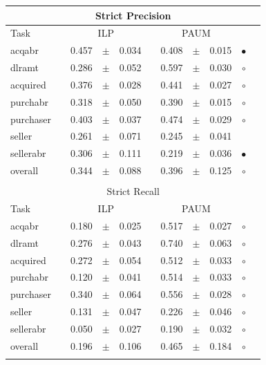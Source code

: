 \begin{table}[h!]
\centering 
\begin{tabular}
{lcrclcrcl@{\hspace{0.1cm}}cc}

\multicolumn{11}{c}{Strict Precision}\\
\hline
Task && \multicolumn{3}{c}{ILP}  && \multicolumn{3}{c}{PAUM} && \\
\hline
            acqabr &&      0.457 &  $\pm$  &       0.034 & &      0.408 &  $\pm$  &       0.015 & $\bullet$ \\
            dlramt &&      0.286 &  $\pm$  &       0.052 & &      0.597 &  $\pm$  &       0.030 & $\circ$ \\
          acquired &&      0.376 &  $\pm$  &       0.028 & &      0.441 &  $\pm$  &       0.027 & $\circ$ \\
          purchabr &&      0.318 &  $\pm$  &       0.050 & &      0.390 &  $\pm$  &       0.015 & $\circ$ \\
         purchaser &&      0.403 &  $\pm$  &       0.037 & &      0.474 &  $\pm$  &       0.029 & $\circ$ \\
            seller &&      0.261 &  $\pm$  &       0.071 & &      0.245 &  $\pm$  &       0.041 &  \\
         sellerabr &&      0.306 &  $\pm$  &       0.111 & &      0.219 &  $\pm$  &       0.036 & $\bullet$ \\
\hline
           overall &&      0.344 &  $\pm$  &       0.088 & &      0.396 &  $\pm$  &       0.125 & $\circ$ \\
\hline
\\

\multicolumn{11}{c}{Strict Recall}\\
\hline
Task && \multicolumn{3}{c}{ILP}  && \multicolumn{3}{c}{PAUM} && \\
\hline
            acqabr &&      0.180 &  $\pm$  &       0.025 & &      0.517 &  $\pm$  &       0.027 & $\circ$ \\
            dlramt &&      0.276 &  $\pm$  &       0.043 & &      0.740 &  $\pm$  &       0.063 & $\circ$ \\
          acquired &&      0.272 &  $\pm$  &       0.054 & &      0.512 &  $\pm$  &       0.033 & $\circ$ \\
          purchabr &&      0.120 &  $\pm$  &       0.041 & &      0.514 &  $\pm$  &       0.033 & $\circ$ \\
         purchaser &&      0.340 &  $\pm$  &       0.064 & &      0.556 &  $\pm$  &       0.028 & $\circ$ \\
            seller &&      0.131 &  $\pm$  &       0.047 & &      0.226 &  $\pm$  &       0.046 & $\circ$ \\
         sellerabr &&      0.050 &  $\pm$  &       0.027 & &      0.190 &  $\pm$  &       0.032 & $\circ$ \\
\hline
           overall &&      0.196 &  $\pm$  &       0.106 & &      0.465 &  $\pm$  &       0.184 & $\circ$ \\
\hline
\\


\end{tabular}
\end{table}
